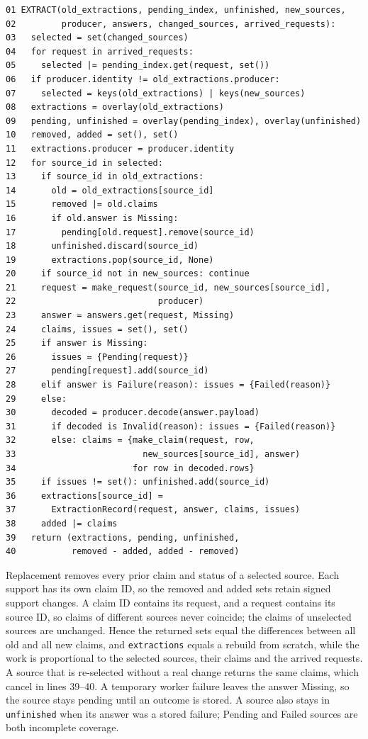 \documentclass[11pt]{article}
\newcommand{\code}[1]{\texttt{#1}}
\begin{document}
\begin{algorithm}[tbp]
{\footnotesize
\begin{verbatim}
01 EXTRACT(old_extractions, pending_index, unfinished, new_sources,
02         producer, answers, changed_sources, arrived_requests):
03   selected = set(changed_sources)
04   for request in arrived_requests:
05     selected |= pending_index.get(request, set())
06   if producer.identity != old_extractions.producer:
07     selected = keys(old_extractions) | keys(new_sources)
08   extractions = overlay(old_extractions)
09   pending, unfinished = overlay(pending_index), overlay(unfinished)
10   removed, added = set(), set()
11   extractions.producer = producer.identity
12   for source_id in selected:
13     if source_id in old_extractions:
14       old = old_extractions[source_id]
15       removed |= old.claims
16       if old.answer is Missing:
17         pending[old.request].remove(source_id)
18       unfinished.discard(source_id)
19       extractions.pop(source_id, None)
20     if source_id not in new_sources: continue
21     request = make_request(source_id, new_sources[source_id],
22                            producer)
23     answer = answers.get(request, Missing)
24     claims, issues = set(), set()
25     if answer is Missing:
26       issues = {Pending(request)}
27       pending[request].add(source_id)
28     elif answer is Failure(reason): issues = {Failed(reason)}
29     else:
30       decoded = producer.decode(answer.payload)
31       if decoded is Invalid(reason): issues = {Failed(reason)}
32       else: claims = {make_claim(request, row,
33                         new_sources[source_id], answer)
34                       for row in decoded.rows}
35     if issues != set(): unfinished.add(source_id)
36     extractions[source_id] =
37       ExtractionRecord(request, answer, claims, issues)
38     added |= claims
39   return (extractions, pending, unfinished,
40           removed - added, added - removed)
\end{verbatim}}
\caption{EXTRACT maintains the shared extraction records.}\label{alg:extract}
\end{algorithm}

Replacement removes every prior claim and status of a selected source. Each
support has its own claim ID, so the removed and added sets retain signed
support changes. A claim ID contains its request, and a request contains its
source ID, so claims of different sources never coincide; the claims of
unselected sources are unchanged. Hence the returned sets equal the differences
between all old and all new claims, and \code{extractions} equals a rebuild from
scratch, while the work is proportional to the selected sources, their claims
and the arrived requests. A source that is re-selected without a real change
returns the same claims, which cancel in lines 39--40. A temporary worker
failure leaves the answer Missing, so the source stays pending until an outcome
is stored. A source also stays in \code{unfinished} when its answer was a stored
failure; Pending and Failed sources are both incomplete coverage.
\end{document}
